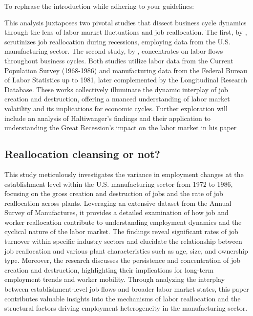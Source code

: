 \documentclass[12pt]{article}
\begin{document}
To rephrase the introduction while adhering to your guidelines:

This analysis juxtaposes two pivotal studies that dissect business cycle dynamics through the lens of labor market
fluctuations and job reallocation. The first, by \cite{DavHalt92}, scrutinizes job reallocation during
recessions, employing data from the U.S. manufacturing sector. The second study, by \cite{BlaDia90},
concentrates on labor flows throughout business cycles. Both studies utilize labor data from the Current Population
Survey (1968-1986) and manufacturing data from the Federal Bureau of Labor Statistics up to 1981, later complemented by
the Longitudinal Research Database. These works collectively illuminate the dynamic interplay of job creation and
destruction, offering a nuanced understanding of labor market volatility and its implications for economic cycles.
Further exploration will include an analysis of Haltiwanger's findings and their application to understanding
the Great Recession's impact on the labor market in his paper \cite{FosHal16}
\subsection{Reallocation cleansing or not?}
This study meticulously investigates the variance in employment changes at the establishment level within the U.S.
manufacturing sector from 1972 to 1986, focusing on the gross creation and destruction of jobs and the rate of job
reallocation across plants. Leveraging an extensive dataset from the Annual Survey of Manufactures, it provides a
detailed examination of how job and worker reallocation contribute to understanding employment dynamics and the cyclical
nature of the labor market. The findings reveal significant rates of job turnover within specific industry sectors and
elucidate the relationship between job reallocation and various plant characteristics such as age, size, and ownership
type. Moreover, the research discusses the persistence and concentration of job creation and destruction, highlighting
their implications for long-term employment trends and worker mobility. Through analyzing the interplay between
establishment-level job flows and broader labor market states, this paper contributes valuable insights into the
mechanisms of labor reallocation and the structural factors driving employment heterogeneity in the manufacturing
sector. 
\end{document}
